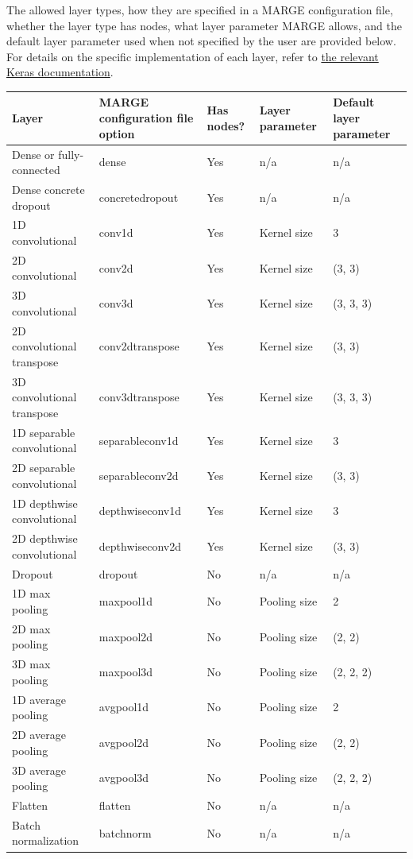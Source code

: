 \documentclass[letterpaper, 12pt]{article}
\begin{document}
The allowed layer types, how they are specified in a MARGE configuration 
file, whether the layer type has nodes, what layer parameter MARGE allows, and 
the default layer parameter used when not specified by the user are provided 
below.  For details on the specific implementation of each layer, refer to 
\href{https://keras.io/api/layers/}{the relevant Keras documentation}.

\begin{center}
	\begin{tabular}{| l | p{3cm} | l | l | p{2cm} |}
		\hline
		Layer & MARGE configuration file option & Has nodes? & Layer parameter & Default layer parameter \\
		\hline\hline
		Dense or fully-connected & dense & Yes & n/a  & n/a\\
		Dense concrete dropout & concretedropout & Yes & n/a & n/a \\
		1D convolutional & conv1d & Yes &  Kernel size & 3 \\
		2D convolutional & conv2d & Yes &  Kernel size & (3, 3) \\
		3D convolutional & conv3d & Yes &  Kernel size & (3, 3, 3) \\
		2D convolutional transpose & conv2dtranspose & Yes &  Kernel size & (3, 3) \\
		3D convolutional transpose & conv3dtranspose & Yes &  Kernel size & (3, 3, 3) \\
		1D separable convolutional & separableconv1d & Yes &  Kernel size & 3 \\
		2D separable convolutional & separableconv2d & Yes &  Kernel size & (3, 3) \\
		1D depthwise convolutional & depthwiseconv1d & Yes &  Kernel size & 3 \\
		2D depthwise convolutional & depthwiseconv2d & Yes &  Kernel size & (3, 3) \\
		Dropout & dropout & No & n/a & n/a \\
		1D max pooling & maxpool1d & No & Pooling size & 2 \\
		2D max pooling & maxpool2d & No & Pooling size & (2, 2) \\
		3D max pooling & maxpool3d & No & Pooling size & (2, 2, 2) \\
		1D average pooling & avgpool1d & No & Pooling size & 2 \\
		2D average pooling & avgpool2d & No & Pooling size & (2, 2) \\
		3D average pooling & avgpool3d & No & Pooling size & (2, 2, 2) \\
		Flatten & flatten & No & n/a & n/a \\
		Batch normalization & batchnorm & No & n/a & n/a \\
		\hline
	\end{tabular}
\end{center}
\end{document}
